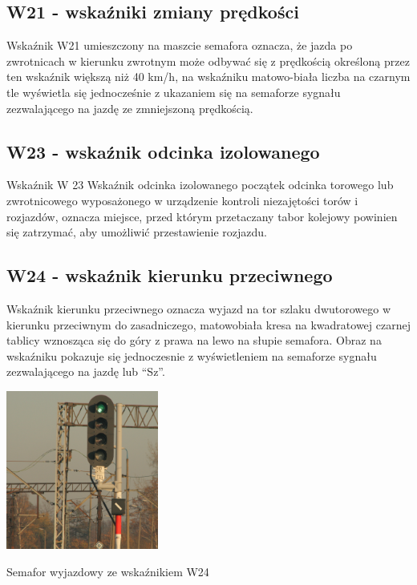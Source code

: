 \subsection{W21 - wskaźniki zmiany prędkości}

Wskaźnik W21 umieszczony na maszcie semafora oznacza, że jazda po zwrotnicach w kierunku zwrotnym może odbywać się z prędkością określoną przez ten  wskaźnik większą niż 40 km/h, na wskaźniku matowo-biała liczba na czarnym tle wyświetla się jednocześnie z ukazaniem się na semaforze sygnału zezwalającego na jazdę ze zmniejszoną prędkością.

\subsection{W23 - wskaźnik odcinka izolowanego}

Wskaźnik W 23 {\textquotedbl}Wskaźnik odcinka izolowanego{\textquotedbl} początek odcinka torowego lub zwrotnicowego
wyposażonego w urządzenie kontroli niezajętości torów i rozjazdów, oznacza miejsce, przed którym przetaczany tabor
kolejowy powinien się zatrzymać, aby umożliwić przestawienie rozjazdu.

\subsection{W24 - wskaźnik kierunku przeciwnego}

\begin{tcolorbox}[colback=black!5!white,colframe=white!55!black,title=Wskaźnik W24]
{\textquotedbl}Wskaźnik kierunku przeciwnego{\textquotedbl} oznacza wyjazd na tor szlaku dwutorowego w kierunku przeciwnym do zasadniczego, matowobiała kresa na kwadratowej czarnej tablicy wznosząca się do góry z prawa na lewo na słupie semafora. Obraz na wskaźniku pokazuje się jednoczesnie z wyświetleniem na semaforze sygnału zezwalającego na jazdę lub “Sz”.
\end{tcolorbox}
	\begin{marginfigure}
	\includegraphics[width=5cm]{skryptkierownik-img/skryptkierownik-img018.jpg}
	\caption{Semafor wyjazdowy ze wskaźnikiem W24}
\end{marginfigure} 

